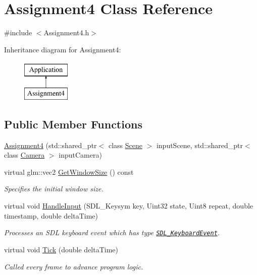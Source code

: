 \hypertarget{class_assignment4}{}\section{Assignment4 Class Reference}
\label{class_assignment4}


{\ttfamily \#include $<$Assignment4.\+h$>$}

Inheritance diagram for Assignment4\+:\begin{figure}[H]
\begin{center}
\leavevmode
\includegraphics[height=2.000000cm]{class_assignment4}
\end{center}
\end{figure}
\subsection*{Public Member Functions}
\begin{DoxyCompactItemize}
\item
\hyperlink{class_assignment4_a318b02cf93165113069f3b44a8d13589}{Assignment4} (std\+::shared\+\_\+ptr$<$ class \hyperlink{class_scene}{Scene} $>$ input\+Scene, std\+::shared\+\_\+ptr$<$ class \hyperlink{class_camera}{Camera} $>$ input\+Camera)
\item 
virtual glm\+::vec2 \hyperlink{class_assignment4_ad197b75e730f9b32458429df8d55458e}{Get\+Window\+Size} () const
\begin{DoxyCompactList}\small\item\em Specifies the initial window size. \end{DoxyCompactList}\item
virtual void \hyperlink{class_assignment4_a02c51d46e2cbb55e7963b6bfbedaf1c4}{Handle\+Input} (S\+D\+L\+\_\+\+Keysym key, Uint32 state, Uint8 repeat, double timestamp, double delta\+Time)
\begin{DoxyCompactList}\small\item\em Processes an S\+DL keyboard event which has type \href{https://wiki.libsdl.org/SDL_KeyboardEvent}{\tt S\+D\+L\+\_\+\+Keyboard\+Event}. \end{DoxyCompactList}\item
virtual void \hyperlink{class_assignment4_a3ef3fef7a6ae13603bc453b29e079c5d}{Tick} (double delta\+Time)
\begin{DoxyCompactList}\small\item\em Called every frame to advance program logic. \end{DoxyCompactList}\end{DoxyCompactItemize}
